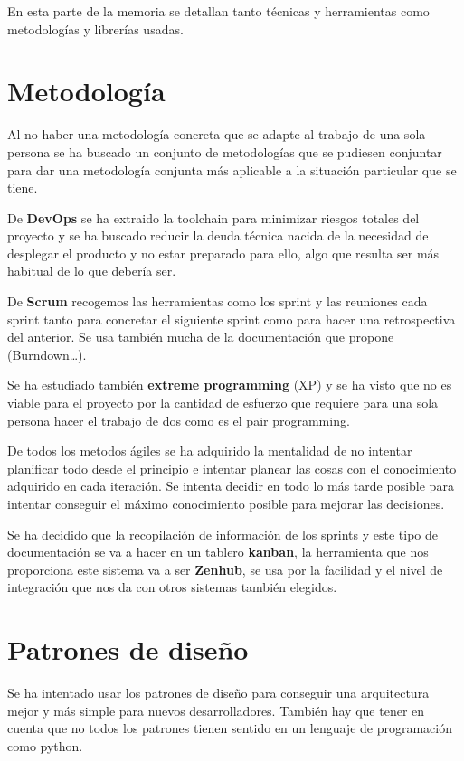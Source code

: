 
En esta parte de la memoria se detallan tanto técnicas y herramientas como metodologías y librerías usadas.


\section{Metodología}

Al no haber una metodología concreta que se adapte al trabajo de una sola persona se ha buscado un conjunto de metodologías que se pudiesen conjuntar para dar una metodología conjunta más aplicable a la situación particular que se tiene. 

De \textbf{DevOps} se ha extraido la toolchain para minimizar riesgos totales del proyecto y se ha buscado reducir la deuda técnica nacida de la necesidad de desplegar el producto y no estar preparado para ello, algo que resulta ser más habitual de lo que debería ser.

De \textbf{Scrum} recogemos las herramientas como los sprint y las reuniones cada sprint tanto para concretar el siguiente sprint como para hacer una retrospectiva del anterior. Se usa también mucha de la documentación que propone (Burndown\ldots).

Se ha estudiado también \textbf{extreme programming} (XP) y se ha visto que no es viable para el proyecto por la cantidad de esfuerzo que requiere para una sola persona hacer el trabajo de dos como es el pair programming. 

De todos los metodos ágiles se ha adquirido la mentalidad de no intentar planificar todo desde el principio e intentar planear las cosas con el conocimiento adquirido en cada iteración. Se intenta decidir en todo lo más tarde posible para intentar conseguir el máximo conocimiento posible para mejorar las decisiones.

Se ha decidido que la recopilación de información de los sprints y este tipo de documentación se va a hacer en un tablero \textbf{kanban}, la herramienta que nos proporciona este  sistema va a ser \textbf{Zenhub}, se usa por la facilidad y el nivel de integración que nos da con otros sistemas también elegidos.


\section{Patrones de diseño}

Se ha intentado usar los patrones de diseño para conseguir una arquitectura mejor y más simple para nuevos desarrolladores. También hay que tener en cuenta que no todos los patrones tienen sentido en un lenguaje de programación como python.

